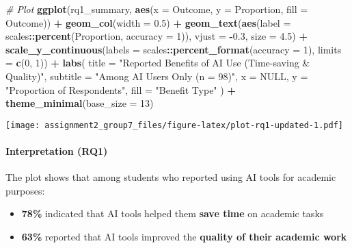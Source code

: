 \documentclass[
]{article}
\newenvironment{Shaded}{\begin{snugshade}}{\end{snugshade}}
\newcommand{\AttributeTok}[1]{\textcolor[rgb]{0.13,0.29,0.53}{#1}}
\newcommand{\CommentTok}[1]{\textcolor[rgb]{0.56,0.35,0.01}{\textit{#1}}}
\newcommand{\ConstantTok}[1]{\textcolor[rgb]{0.56,0.35,0.01}{#1}}
\newcommand{\DecValTok}[1]{\textcolor[rgb]{0.00,0.00,0.81}{#1}}
\newcommand{\FloatTok}[1]{\textcolor[rgb]{0.00,0.00,0.81}{#1}}
\newcommand{\FunctionTok}[1]{\textcolor[rgb]{0.13,0.29,0.53}{\textbf{#1}}}
\newcommand{\NormalTok}[1]{#1}
\newcommand{\SpecialCharTok}[1]{\textcolor[rgb]{0.81,0.36,0.00}{\textbf{#1}}}
\newcommand{\StringTok}[1]{\textcolor[rgb]{0.31,0.60,0.02}{#1}}
\providecommand{\tightlist}{%
  \setlength{\itemsep}{0pt}\setlength{\parskip}{0pt}}
\begin{document}
\begin{Shaded}
\begin{Highlighting}[]
\CommentTok{\# Plot}
\FunctionTok{ggplot}\NormalTok{(rq1\_summary, }\FunctionTok{aes}\NormalTok{(}\AttributeTok{x =}\NormalTok{ Outcome, }\AttributeTok{y =}\NormalTok{ Proportion, }\AttributeTok{fill =}\NormalTok{ Outcome)) }\SpecialCharTok{+}
  \FunctionTok{geom\_col}\NormalTok{(}\AttributeTok{width =} \FloatTok{0.5}\NormalTok{) }\SpecialCharTok{+}
  \FunctionTok{geom\_text}\NormalTok{(}\FunctionTok{aes}\NormalTok{(}\AttributeTok{label =}\NormalTok{ scales}\SpecialCharTok{::}\FunctionTok{percent}\NormalTok{(Proportion, }\AttributeTok{accuracy =} \DecValTok{1}\NormalTok{)),}
            \AttributeTok{vjust =} \SpecialCharTok{{-}}\FloatTok{0.3}\NormalTok{, }\AttributeTok{size =} \FloatTok{4.5}\NormalTok{) }\SpecialCharTok{+}
  \FunctionTok{scale\_y\_continuous}\NormalTok{(}\AttributeTok{labels =}\NormalTok{ scales}\SpecialCharTok{::}\FunctionTok{percent\_format}\NormalTok{(}\AttributeTok{accuracy =} \DecValTok{1}\NormalTok{), }\AttributeTok{limits =} \FunctionTok{c}\NormalTok{(}\DecValTok{0}\NormalTok{, }\DecValTok{1}\NormalTok{)) }\SpecialCharTok{+}
  \FunctionTok{labs}\NormalTok{(}
    \AttributeTok{title =} \StringTok{"Reported Benefits of AI Use (Time{-}saving \& Quality)"}\NormalTok{,}
    \AttributeTok{subtitle =} \StringTok{"Among AI Users Only (n = 98)"}\NormalTok{,}
    \AttributeTok{x =} \ConstantTok{NULL}\NormalTok{,}
    \AttributeTok{y =} \StringTok{"Proportion of Respondents"}\NormalTok{,}
    \AttributeTok{fill =} \StringTok{"Benefit Type"}
\NormalTok{  ) }\SpecialCharTok{+}
  \FunctionTok{theme\_minimal}\NormalTok{(}\AttributeTok{base\_size =} \DecValTok{13}\NormalTok{)}
\end{Highlighting}
\end{Shaded}

\texttt{[image: assignment2\_group7\_files/figure-latex/plot-rq1-updated-1.pdf]}

\paragraph{Interpretation (RQ1)}\label{interpretation-rq1}

The plot shows that among students who reported using AI tools for
academic purposes:

\begin{itemize}
\tightlist
\item
  \textbf{78\%} indicated that AI tools helped them \textbf{save time}
  on academic tasks
\item
  \textbf{63\%} reported that AI tools improved the \textbf{quality of
  their academic work}
\end{itemize}
\end{document}
